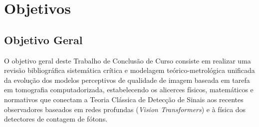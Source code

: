 \documentclass[
  12pt,
  a4paper,
  oneside
]{report}
\begin{document}
\chapter{Objetivos}
\label{chap:objetivos}

\section{Objetivo Geral}
\label{sec:objetivo_geral}
O objetivo geral deste Trabalho de Conclusão de Curso consiste em realizar uma revisão bibliográfica sistemática crítica e modelagem teórico-metrológica unificada da evolução dos modelos perceptivos de qualidade de imagem baseada em tarefa em tomografia computadorizada, estabelecendo os alicerces físicos, matemáticos e normativos que conectam a Teoria Clássica de Detecção de Sinais aos recentes observadores baseados em redes profundas (\emph{Vision Transformers}) e à física dos detectores de contagem de fótons.
\end{document}
